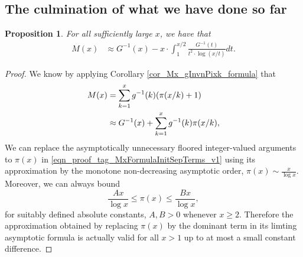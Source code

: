 \documentclass[11pt,reqno,a4letter]{article}
\numberwithin{figure}{section}
\numberwithin{table}{section}
\theoremstyle{plain}
\newtheorem{prop}[theorem]{Proposition}
\numberwithin{theorem}{section}
\theoremstyle{definition}
\begin{document}
\subsection{The culmination of what we have done so far} 

\begin{prop}
\label{prop_Mx_SBP_IntegralFormula} 
For all sufficiently large $x$, we have that 
\begin{align} 
\label{eqn_pf_tag_v2-restated_v2} 
M(x) & \approx G^{-1}(x) - x \cdot \int_1^{x/2} \frac{G^{-1}(t)}{t^2 \cdot \log(x/t)} dt. 
\end{align} 
\end{prop} 
\begin{proof} 
We know by applying Corollary \ref{cor_Mx_gInvnPixk_formula} that 
\begin{align} 
\notag
M(x) & = \sum_{k=1}^{x} g^{-1}(k) (\pi(x/k)+1) \\ 
\label{eqn_proof_tag_MxFormulaInitSepTerms_v1} 
     & \approx G^{-1}(x) + \sum_{k=1}^{x} g^{-1}(k) \pi(x/k), 
\end{align} 
We can replace the asymptotically unnecessary floored integer-valued arguments to $\pi(x)$ 
in \eqref{eqn_proof_tag_MxFormulaInitSepTerms_v1} using 
its approximation by the monotone non-decreasing asymptotic order, $\pi(x) \sim \frac{x}{\log x}$. 
Moreover, we can always 
bound $$\frac{Ax}{\log x} \leq \pi(x) \leq \frac{Bx}{\log x},$$ for suitably defined 
absolute constants, $A,B > 0$ whenever $x \geq 2$. 
Therefore the approximation obtained by replacing $\pi(x)$ by the dominant term in its 
limting asymptotic formula is actually valid for all $x > 1$ up to at most 
a small constant difference. 


\end{proof}
\end{document}
